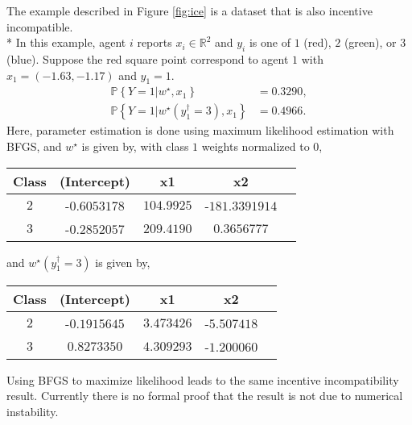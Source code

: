 \documentclass{article}
\begin{document}
The example described in Figure \ref{fig:ice} is a dataset that is also incentive incompatible.
\\* In this example, agent $i $ reports $x_{i} \in \mathbb{R}^{2}$ and $y_{i}$ is one of $1$ (red), $2$ (green), or $3$ (blue). Suppose the red square point correspond to agent $1$ with $x_{1} = \left(-1.63, -1.17\right)$ and $y_{1} = 1$.
\begin{align*}
\mathbb{P}\left\{Y = 1 | w^\star , x_{1}\right\} &= 0.3290,
\\ \mathbb{P}\left\{Y = 1 | w^\star \left(y^{\dagger}_{1} = 3\right), x_{1}\right\} &= 0.4966.
\end{align*}
Here, parameter estimation is done using maximum likelihood estimation with BFGS, and $w^\star $ is given by, with class $1$ weights normalized to $0$,

\begin{center} \begin{tabular}{|c|c|c|c|c|}
\hline
 Class &(Intercept) &x1 &x2\\ \hline
$2$ &-$0.6053178$ &$104.9925$ &-$181.3391914$\\ \hline
$3$ &-$0.2852057$ &$209.4190$ &$0.3656777$\\ \hline
\end{tabular} \end{center}
and $w^\star \left(y^{\dagger}_{1} = 3\right)$ is given by,

\begin{center} \begin{tabular}{|c|c|c|c|c|}
\hline
 Class &(Intercept) &x1 &x2\\ \hline
$2$ &-$0.1915645$ &$3.473426$ &-$5.507418$\\ \hline
$3$ &$0.8273350$ &$4.309293$ &-$1.200060$\\ \hline
\end{tabular} \end{center}
Using BFGS to maximize likelihood leads to the same incentive incompatibility result. Currently there is no formal proof that the result is not due to numerical instability.
\newline \newline
\end{document}
